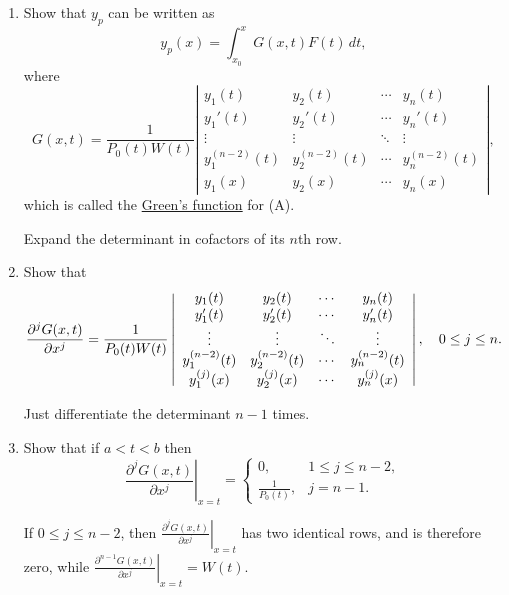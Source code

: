 \documentclass{ximera}
\begin{document}
\begin{problem}
\begin{enumerate}
\item %
Show that  $y_p$  can be written as
$$
y_p(x)=\int_{x_0}^x G(x,t)F(t)\,dt,
$$
where
$$
G(x,t)=\frac{1}{P_0(t)W(t)}\left|\begin{array}{cccc}
y_1(t)&y_2(t)&\cdots&y_n(t)\\ 
y_1'(t)&y_2'(t)&\cdots&y_n'(t)\\ 
\vdots&\vdots&\ddots&\vdots\\ 
y_1^{(n-2)}(t)&y_2^{(n-2)}(t)&\cdots&y_n^{(n-2)}(t)\\ 
y_1(x)&y_2(x)&\cdots&y_n(x)\end{array}\right|,
$$
which is called  the
\href{http://www-history.mcs.st-and.ac.uk/Mathematicians/Green.html}
{Green's function} for (A).

\begin{solution}
Expand the determinant in cofactors of its $n$th row.
\end{solution}

\item %
Show that
$$
{\partial^{j}G(x,t)\over\partial x^j}
=\frac{1}{P_0(t)W(t)}\left|\begin{array}{cccc}
y_1(t)&y_2(t)&\cdots&y_n(t)\\ 
y_1'(t)&y_2'(t)&\cdots&y_n'(t)\\ 
\vdots&\vdots&\ddots&\vdots\\ 
y_1^{(n-2)}(t)&y_2^{(n-2)}(t)&\cdots&y_n^{(n-2)}(t)\\ 
y_1^{(j)}(x)&y_2^{(j)}(x)&\cdots&y_n^{(j)}(x)\end{array}\right|,\quad 0\le j\le
n.
$$

\begin{solution}
Just differentiate the determinant $n-1$ times.
\end{solution}

\item %
Show that if $a<t<b$ then
$$
\left.\frac{\partial^{j}G(x,t)}{\partial x^j}\right|_{x=t}=
\left\{\begin{array}{cl} 0,&1\le j\le n-2,\\ 
\frac{1}{P_0(t)},&j=n-1.
\end{array}\right.
$$

\begin{solution}
If $0\le j\le n-2$, then
$\left.\frac{\partial^{j}G(x,t)}{\partial x^j}\right|_{x=t}$
has two identical rows, and is therefore zero, while
$\left.\frac{\partial^{n-1}G(x,t)}{\partial x^j}\right|_{x=t}=W(t)$.
\end{solution}


\end{enumerate}
\end{problem}
\end{document}
